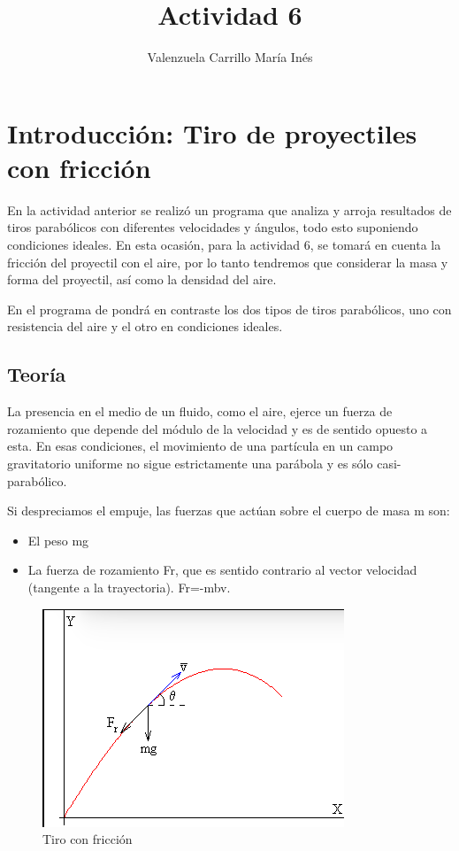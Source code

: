 \documentclass[a4paper]{article}
\title{Actividad 6}
\author{Valenzuela Carrillo María Inés}
\begin{document}
\maketitle


\section{Introducción: Tiro de proyectiles con fricción }

En la actividad anterior se realizó un programa que analiza y arroja resultados de tiros parabólicos con diferentes velocidades y ángulos, todo esto suponiendo condiciones ideales. En esta ocasión, para la actividad 6, se tomará en cuenta la fricción del proyectil con el aire, por lo tanto tendremos que considerar la masa y forma del proyectil, así como la densidad del aire.

En el programa de pondrá en contraste los dos tipos de tiros parabólicos, uno con resistencia del aire y el otro en condiciones ideales.

\subsection{Teoría}

La presencia en el medio de un fluido, como el aire, ejerce un fuerza de rozamiento que depende del módulo de la velocidad y es de sentido opuesto a esta. En esas condiciones, el movimiento de una partícula en un campo gravitatorio uniforme no sigue estrictamente una parábola y es sólo casi-parabólico.

Si despreciamos el empuje, las fuerzas que actúan sobre el cuerpo de masa m son:

\begin{itemize}
\item El peso mg
\item La fuerza de rozamiento Fr, que es sentido contrario al vector velocidad (tangente a la trayectoria). Fr=-mbv.
\end{itemize}

\begin{figure}[h]
\centering
\includegraphics[width=5 cm]{tiro.png}
\caption{\label{fig:tiro}Tiro con fricción }
\end{figure}
\end{document}
